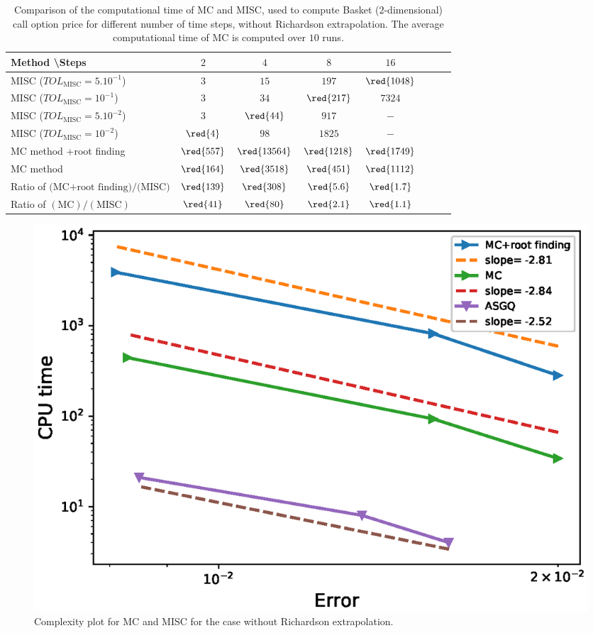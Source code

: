 \begin{table}[h!]
\centering
\begin{tabular}{l*{6}{c}r}
Method \textbackslash  Steps            & $2$ & $4$ & $8$ & $16$ &   \\
\hline
MISC ($TOL_{\text{MISC}}=5.10^{-1}$) & $3$ & $15$ & $197$ & $\red{ 1048}$  \\
MISC ($TOL_{\text{MISC}}=10^{-1}$)  & $3$ & $34$ & $\red{217}$ & $ 7324$  \\
MISC ($TOL_{\text{MISC}}=5.10^{-2}$)  & $3$ & $\red{44}$ & $917$ & $-$  \\
MISC ($TOL_{\text{MISC}}=10^{-2}$)  & $\red{4}$ & $98$ & $1825$ & $-$  \\
\hline
MC method +root finding   & $\red{  557}$ & $\red{   13564}$ & $\red{  1218}$ & $\red{ 1749
}$  \\
MC method & $\red{164}$ & $\red{3518}$ & $\red{451}$ & $\red{1112}$  \\
\hline

Ratio of	$\text{(MC+root finding)}/\text{(MISC)}$ & $\red{139}$ & $\red{  308}$ & $\red{5.6}$ & $\red{1.7}$  \\
Ratio of	$(\text{MC})/(\text{MISC})$ & $\red{41}$ & $\red{80}$ & $\red{2.1}$ & $\red{ 1.1}$  \\
\hline
\end{tabular}
\caption{Comparison of the computational time of  MC and MISC, used to compute Basket ($2$-dimensional) call option price  for different number of time steps, without Richardson extrapolation. The average computational time of MC is computed over $10$ runs.}
\label{Comparsion of the computational time of  MC and MISC, used to compute Basket 2d Call option price  for different number of time steps, without Richardson extrapolation, beta_16}
\end{table}


\FloatBarrier

\begin{figure}[h!]
	\centering
	\includegraphics[width=0.4\linewidth]{./figures/Basket_2d_Complexity_rates/error_vs_time}
	
	\caption{Complexity plot for MC and MISC for the case without Richardson extrapolation.}
	\label{fig:Complexity plot for MC and MISC , Basket 2d Call non rich}
\end{figure}

